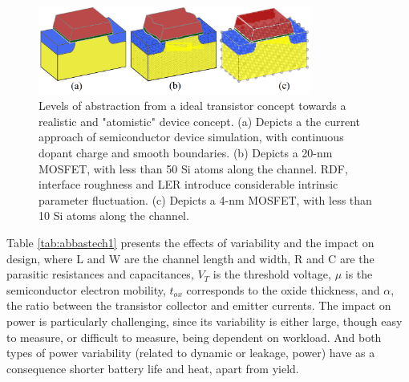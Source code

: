 \documentclass[pgmicro,diss,english]{iiufrgs}
\begin{document}
    \begin{figure} []
        \centering
        \includegraphics[width=0.8\textwidth, trim={0 0 0 0},clip]{transistorVariability.png}
        \caption{Levels of abstraction from a ideal transistor concept towards a realistic and "atomistic" device concept. (a) Depicts a the current approach of semiconductor device simulation, with continuous dopant charge and smooth boundaries. (b) Depicts a 20-nm MOSFET, with less than 50 Si atoms along the channel. RDF, interface roughness and LER introduce considerable intrinsic parameter fluctuation. (c) Depicts a 4-nm MOSFET, with less than 10 Si atoms along the channel. }
        \label{fig:transAbs}
    \end{figure}

\begin{table}[]
\centering
\caption{Impact of variability on performance and power.}
\label{tab:abbastech1}
\end{table}

Table \ref{tab:abbastech1} presents the effects of variability and the impact on design, where L and W are the channel length and  width, R and C are the parasitic resistances and capacitances, $V_{T}$ is the threshold voltage, $\mu$ is the semiconductor electron mobility, $t_{ox}$ corresponds to the oxide thickness, and $\alpha$, the ratio between the transistor collector and emitter currents. The impact on power is particularly challenging, since its variability is either large, though easy to measure, or difficult to measure, being dependent on workload. And both types of power variability (related to dynamic or leakage, power) have as a consequence shorter battery life and heat, apart from yield.
\end{document}
